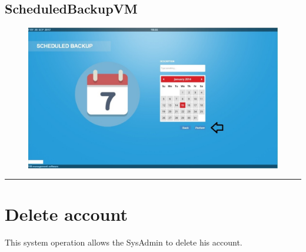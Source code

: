 \subsection{ScheduledBackupVM}


\begin{figure}[H]
\centering
\includegraphics[width=170mm]{images/softschBackup.eps}
\caption{\label{overflow}}
\end{figure}


\hrule
\vspace{0.5cm}




\section{Delete account}
\label{operation:ConfirmDelete}
This system operation allows the SysAdmin to delete his account.

